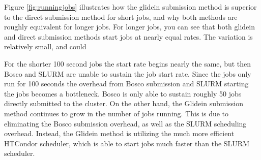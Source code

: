 \documentclass[conference]{IEEEtran}
\begin{document}
Figure \ref{fig:runningjobs} illustrates how the glidein submission method is superior to the direct submission method for short jobs, and why both methods are roughly equivalent for longer jobs.  For longer jobs, you can see that both glidein and direct submission methods start jobs at nearly equal rates.  The variation is relatively small, and could 

For the shorter 100 second jobs the start rate begins nearly the same, but then Bosco and SLURM are unable to sustain the job start rate.  Since the jobs only run for 100 seconds the overhead from Bosco submission and SLURM starting the jobs becomes a bottleneck.  Bosco is only able to sustain roughly 50 jobs directly submitted to the cluster.  On the other hand, the Glidein submission method continues to grow in the number of jobs running.  This is due to eliminating the Bosco submission overhead, as well as the SLURM scheduling overhead.  Instead, the Glidein method is utilizing the much more efficient HTCondor scheduler, which is able to start jobs much faster than the SLURM scheduler.



%
%

\end{document}

